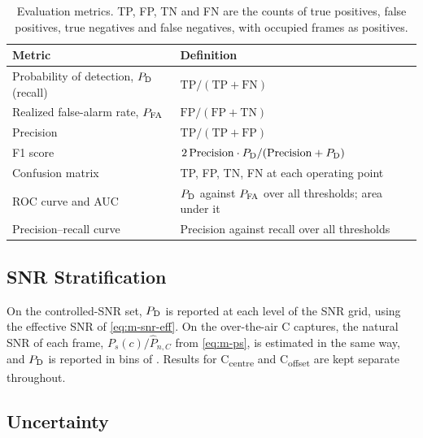 \begin{table}[tbp]
  \centering
  \caption[Evaluation metrics]{Evaluation metrics. TP, FP, TN and FN are the counts of true positives, false positives, true negatives and false negatives, with occupied frames as positives.}
  \label{tab:m-metrics}
  \begin{tabularx}{\textwidth}{@{} l >{\raggedright\arraybackslash}X @{}}
    \toprule
    Metric & Definition \\
    \midrule
    Probability of detection, $P_{\mathrm{D}}$ (recall) & $\mathrm{TP}/(\mathrm{TP}+\mathrm{FN})$ \\
    Realized false-alarm rate, $P_{\mathrm{FA}}$ & $\mathrm{FP}/(\mathrm{FP}+\mathrm{TN})$ \\
    Precision & $\mathrm{TP}/(\mathrm{TP}+\mathrm{FP})$ \\
    F1 score & $2\,\mathrm{Precision}\cdot P_{\mathrm{D}}/(\mathrm{Precision}+P_{\mathrm{D}})$ \\
    Confusion matrix & TP, FP, TN, FN at each operating point \\
    ROC curve and AUC & $P_{\mathrm{D}}$ against $P_{\mathrm{FA}}$ over all thresholds; area under it \\
    Precision--recall curve & Precision against recall over all thresholds \\
    \bottomrule
  \end{tabularx}
\end{table}

\subsection{SNR Stratification}
\label{sec:m-strata}

On the controlled-SNR set, $P_{\mathrm{D}}$ is reported at each level of the SNR grid, using the effective SNR of \cref{eq:m-snr-eff}. On the over-the-air C captures, the natural SNR of each frame, $P_s(c)/\hat{P}_{n,C}$ from \cref{eq:m-ps}, is estimated in the same way, and $P_{\mathrm{D}}$ is reported in bins of . Results for C\textsubscript{centre} and C\textsubscript{offset} are kept separate throughout.

\subsection{Uncertainty}
\label{sec:m-uncertainty}

